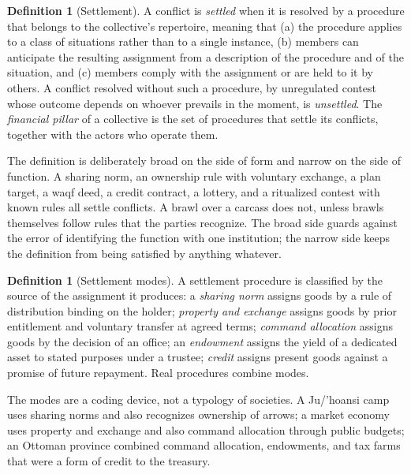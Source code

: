 \documentclass[11pt,letterpaper]{article}
\theoremstyle{definition}
\newtheorem{definition}[theorem]{Definition}
\theoremstyle{remark}
\begin{document}
\begin{definition}[Settlement]
\label{def:financial-power:settlement}
A conflict is \emph{settled} when it is resolved by a procedure that belongs to the collective's repertoire, meaning that (a) the procedure applies to a class of situations rather than to a single instance, (b) members can anticipate the resulting assignment from a description of the procedure and of the situation, and (c) members comply with the assignment or are held to it by others. A conflict resolved without such a procedure, by unregulated contest whose outcome depends on whoever prevails in the moment, is \emph{unsettled}. The \emph{financial pillar} of a collective is the set of procedures that settle its conflicts, together with the actors who operate them.
\end{definition}

The definition is deliberately broad on the side of form and narrow on the side of function. A sharing norm, an ownership rule with voluntary exchange, a plan target, a waqf deed, a credit contract, a lottery, and a ritualized contest with known rules all settle conflicts. A brawl over a carcass does not, unless brawls themselves follow rules that the parties recognize. The broad side guards against the error of identifying the function with one institution; the narrow side keeps the definition from being satisfied by anything whatever.

\begin{definition}[Settlement modes]
\label{def:financial-power:settlement-modes}
A settlement procedure is classified by the source of the assignment it produces: a \emph{sharing norm} assigns goods by a rule of distribution binding on the holder; \emph{property and exchange} assigns goods by prior entitlement and voluntary transfer at agreed terms; \emph{command allocation} assigns goods by the decision of an office; an \emph{endowment} assigns the yield of a dedicated asset to stated purposes under a trustee; \emph{credit} assigns present goods against a promise of future repayment. Real procedures combine modes.
\end{definition}

The modes are a coding device, not a typology of societies. A Ju/'hoansi camp uses sharing norms and also recognizes ownership of arrows; a market economy uses property and exchange and also command allocation through public budgets; an Ottoman province combined command allocation, endowments, and tax farms that were a form of credit to the treasury.
\end{document}

